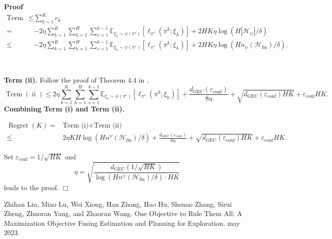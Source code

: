 \documentclass{article}
\newcommand{\tmop}[1]{\ensuremath{\operatorname{#1}}}
\newenvironment{proof}{\noindent\textbf{Proof\ }}{\hspace*{\fill}$\Box$\medskip}
\begin{document}
\begin{proof}
  \begin{align}
    \text{Term (i)} \leq & \sum_{k = 1}^K c_k \nonumber\\
    = & - 2 \eta \sum_{k = 1}^K \sum_{h = 1}^H \sum_{s = 1}^{k - 1}
    \mathbb{E}_{\xi_h \sim \psi (\pi^s)} [\ell_{\pi^s} (\pi^k ; \xi_h)] + 2 H
    K \eta \log (H | \mathcal{H}_{\psi} | / \delta) \nonumber\\
    \leq & - 2 \eta \sum_{k = 1}^K \sum_{h = 1}^H \sum_{s = 1}^{k - 1}
    \mathbb{E}_{\xi_h \sim \psi (\pi^s)} [\ell_{\pi^s} (\pi^k ; \xi_h)] + 2 H
    K \eta \log (H n_{\psi} (\mathcal{H}_{\tmop{fin}}) / \delta) . \nonumber
  \end{align}
  
  \
  
  \textbf{Term (ii).} Follow the proof of Theorem 4.4 in
  {\cite{liu_one_2023}},
  \[ \tmop{Term} (\tmop{ii}) \leq 2 \eta \sum_{k = 1}^K \sum_{h = 1}^H \sum_{s
     = 1}^{k - 1} \mathbb{E}_{\xi_h \sim \psi (\pi^s)} [\ell_{\pi^s} (\pi^k ;
     \xi_h)] + \frac{d_{\tmop{GEC}} (\varepsilon_{\tmop{conf}})}{8 \eta} +
     \sqrt{d_{\tmop{GEC}} (\varepsilon_{\tmop{conf}}) H K} +
     \varepsilon_{\tmop{conf}} H K. \]
  \textbf{Combining Term (i) and Term (ii).}
  
  \begin{align}
    \tmop{Regret} (K) = & \text{Term (i)} + \text{Term (ii)} \nonumber\\
    \leq & 2 \eta K H \log (H n^{\psi} (\mathcal{H}_{\tmop{fin}}) / \delta) +
    \frac{d_{\tmop{GEC}} (\varepsilon_{\tmop{conf}})}{8 \eta} +
    \sqrt{d_{\tmop{GEC}} (\varepsilon_{\tmop{conf}}) H K} +
    \varepsilon_{\tmop{conf}} H K. \nonumber
  \end{align}
  
  Set $\varepsilon_{\tmop{conf}} = 1 / \sqrt{H K}$ and
  \[ \eta = \sqrt{\frac{d_{\tmop{GEC}} \left( 1 / \sqrt{H K} \right)}{\log (H
     n^{\psi} (\mathcal{H}_{\tmop{fin}}) / \delta) \cdot H K}} \]
  leads to the proof.
\end{proof}

\begin{thebibliography}{1}
  Zhihan Liu, Miao Lu, Wei Xiong, Han Zhong, Hao Hu,
  Shenao Zhang, Sirui Zheng, Zhuoran Yang, and  Zhaoran Wang. {\newblock}One
  Objective to Rule Them All: A Maximization Objective Fusing Estimation and
  Planning for Exploration. {\newblock}may 2023.{\newblock}
\end{thebibliography}
\end{document}
